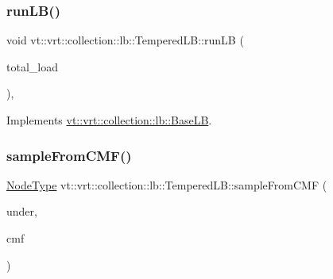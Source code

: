 \mbox{\label{structvt_1_1vrt_1_1collection_1_1lb_1_1_tempered_l_b_a18efa54b58d642d8bb1cd373514e814f}} 
\subsubsection{\texorpdfstring{run\+L\+B()}{runLB()}}
{\footnotesize\ttfamily void vt\+::vrt\+::collection\+::lb\+::\+Tempered\+L\+B\+::run\+LB (\begin{DoxyParamCaption}\item[{\hyperlink{namespacevt_a876a9d0cd5a952859c72de8a46881442}{Time\+Type}}]{total\+\_\+load }\end{DoxyParamCaption})\hspace{0.3cm}{\ttfamily [override]}, {\ttfamily [virtual]}}



Implements \hyperlink{structvt_1_1vrt_1_1collection_1_1lb_1_1_base_l_b_a7caaf2483f046927fd7534a084a8c1b2}{vt\+::vrt\+::collection\+::lb\+::\+Base\+LB}.

\mbox{\label{structvt_1_1vrt_1_1collection_1_1lb_1_1_tempered_l_b_a674736589bb2c1cadba7516e0bf598b9}} 
\subsubsection{\texorpdfstring{sample\+From\+C\+M\+F()}{sampleFromCMF()}}
{\footnotesize\ttfamily \hyperlink{namespacevt_a866da9d0efc19c0a1ce79e9e492f47e2}{Node\+Type} vt\+::vrt\+::collection\+::lb\+::\+Tempered\+L\+B\+::sample\+From\+C\+MF (\begin{DoxyParamCaption}\item[{\hyperlink{structvt_1_1vrt_1_1collection_1_1lb_1_1_tempered_l_b_aa18a0edaf10119e307e7209371caa673}{Node\+Set\+Type} const \&}]{under,  }\item[{std\+::vector$<$ double $>$ const \&}]{cmf }\end{DoxyParamCaption})\hspace{0.3cm}{\ttfamily [protected]}}

